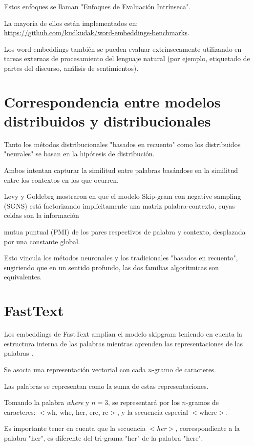 Estos enfoques se llaman "Enfoques de Evaluación Intrínseca".

La mayoría de ellos están implementados en: \url{https://github.com/kudkudak/word-embeddings-benchmarks}.

Los word embeddings también se pueden evaluar extrínsecamente utilizando en tareas externas de procesamiento del lenguaje natural (por ejemplo, etiquetado de partes del discurso, análisis de sentimientos).

\section{Correspondencia entre modelos distribuidos y distribucionales}
Tanto los métodos distribucionales "basados en recuento" como los distribuidos "neurales" se basan en la hipótesis de distribución.

Ambos intentan capturar la similitud entre palabras basándose en la similitud entre los contextos en los que ocurren.

Levy y Goldebrg mostraron en \cite{levy2014neural} que el modelo Skip-gram con negative sampling (SGNS) está factorizando implícitamente una matriz palabra-contexto, cuyas celdas son la información

mutua puntual (PMI) de los pares respectivos de palabra y contexto, desplazada por una constante global.

Esto vincula los métodos neuronales y los tradicionales "basados en recuento", sugiriendo que en un sentido profundo, las dos familias algorítmicas son equivalentes.

\section{FastText}
Los embeddings de FastText amplían el modelo skipgram teniendo en cuenta la estructura interna de las palabras mientras aprenden las representaciones de las palabras \cite{bojanowski2016enriching}.

Se asocia una representación vectorial con cada $n$-gramo de caracteres.

Las palabras se representan como la suma de estas representaciones.

Tomando la palabra \emph{where} y $n = 3$, se representará por los $n$-gramos de caracteres: $<$wh, whe, her, ere, re$>$, y la secuencia especial $<$where$>$.

Es importante tener en cuenta que la secuencia \emph{$<$her$>$}, correspondiente a la palabra "her", es diferente del tri-grama "her" de la palabra "here".

